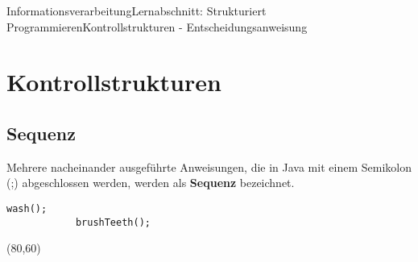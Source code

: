 \documentclass[11pt,oneside,openany,headings=optiontotoc,11pt,numbers=noenddot]{article}
\begin{document}
	\begin{worksheet}{Informationsverarbeitung}{Lernabschnitt: Strukturiert Programmieren}{Kontrollstrukturen - Entscheidungsanweisung}
		\setcounter{section}{5}
		\setcounter{page}{21}
		\section{Kontrollstrukturen}
		\subsection{Sequenz}
		Mehrere nacheinander ausgeführte Anweisungen, die in Java mit einem Semikolon (;) abgeschlossen werden, werden als \textbf{Sequenz} bezeichnet.\\
		\par\noindent
		\begin{minipage}[t]{0.48\textwidth}
			\vspace*{0pt}
			\begin{lstlisting}[style=JavaInputStyle,frame=single]
			wash();
			brushTeeth();
			\end{lstlisting}
		\end{minipage}
		\hfill
		\begin{minipage}[t]{0.48\textwidth}
			\vspace*{0pt}
			\begin{struktogramm}(80,60)
			\end{struktogramm}
		\end{minipage}
		\vspace*{-120pt}

\end{worksheet}
\end{document}
